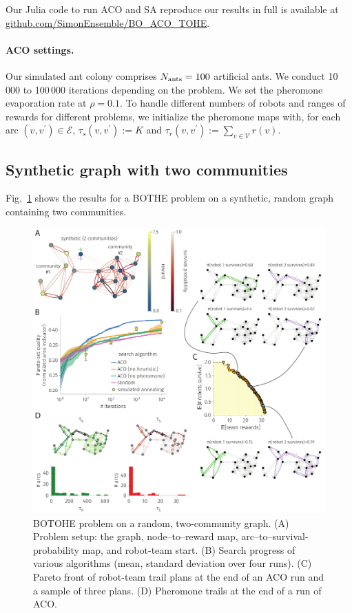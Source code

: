 \documentclass[fleqn,10pt,lineno]{wlpeerj}
\begin{document}
Our Julia code to run ACO and SA reproduce our results in full is available at \url{github.com/SimonEnsemble/BO_ACO_TOHE}.

\paragraph{ACO settings.} Our simulated ant colony comprises $N_{\rm ants}=100$ artificial ants. We conduct 10\,000 to 100\,000 iterations depending on the problem.
We set the pheromone evaporation rate at $\rho=0.1$. To handle different numbers of robots and ranges of rewards for different problems, we initialize the pheromone maps with, for each arc $(v, v^\prime)\in\mathcal{E}$, $\tau_s(v, v^\prime) := K$ and $\tau_r(v, v^\prime) := \sum_{v \in \mathcal{V}} r(v)$.


  
\subsection{Synthetic graph with two communities}
Fig.~\ref{fig:two_community} shows the results for a BOTHE problem on a synthetic, random graph containing two communities.

\begin{figure}[h!]
    \centering
    	\includegraphics[width=\textwidth]{block_model_results.pdf}
    \caption{
    BOTOHE problem on a random, two-community graph. 
    (A) Problem setup: the graph, node--to--reward map, arc--to--survival-probability map, and robot-team start.
    (B) Search progress of various algorithms (mean, standard deviation over four runs).
    (C) Pareto front of robot-team trail plans at the end of an ACO run and a sample of three plans.
    (D) Pheromone trails at the end of a run of ACO.
    } \label{fig:two_community}
\end{figure}
\end{document}
